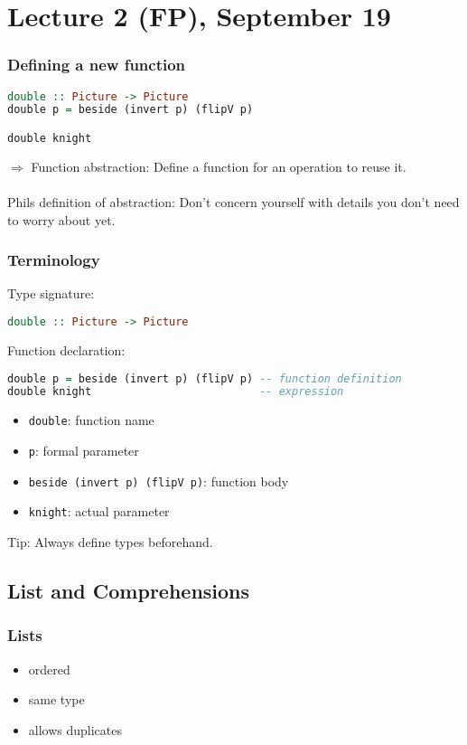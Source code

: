 \documentclass{article}
\begin{document}
\section{Lecture 2 (FP), September 19}
\subsubsection{Defining a new function}
\begin{lstlisting}[language=haskell]
double :: Picture -> Picture
double p = beside (invert p) (flipV p)

double knight
\end{lstlisting}
$\Rightarrow$ Function abstraction: Define a function for an operation to reuse it.\\\\
Phils definition of abstraction: Don't concern yourself with details you don't need to worry about yet.
\subsubsection{Terminology}
Type signature:
\begin{lstlisting}[language=haskell]
double :: Picture -> Picture
\end{lstlisting}
Function declaration:
\begin{lstlisting}[language=haskell]
double p = beside (invert p) (flipV p) -- function definition
double knight                          -- expression
\end{lstlisting}
\begin{itemize}
    \item \texttt{double}: function name
    \item \texttt{p}: formal parameter
    \item \texttt{beside (invert p) (flipV p)}: function body
    \item \texttt{knight}: actual parameter
\end{itemize}
Tip: Always define types beforehand.
\subsection{List and Comprehensions}
\subsubsection{Lists}
\begin{itemize}
    \item ordered
    \item same type
    \item allows duplicates
\end{itemize}
\end{document}
